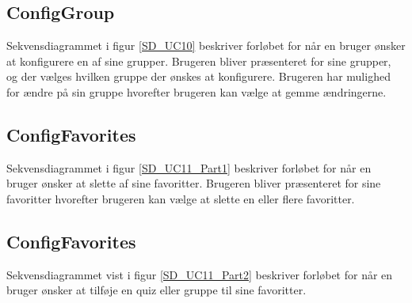 
\subsection*{ConfigGroup}
Sekvensdiagrammet i figur \ref{SD_UC10} beskriver forløbet for når en bruger ønsker at konfigurere en af sine grupper. Brugeren bliver præsenteret for sine grupper, og der vælges hvilken gruppe der ønskes at konfigurere. Brugeren har mulighed for ændre på sin gruppe hvorefter brugeren kan vælge at gemme ændringerne.


\subsection*{ConfigFavorites}
Sekvensdiagrammet i figur \ref{SD_UC11_Part1} beskriver forløbet for når en bruger ønsker at slette af sine favoritter. Brugeren bliver præsenteret for sine favoritter hvorefter brugeren kan vælge at slette en eller flere favoritter.


\subsection*{ConfigFavorites}
Sekvensdiagrammet vist i figur \ref{SD_UC11_Part2} beskriver forløbet for når en bruger ønsker at tilføje en quiz eller gruppe til sine favoritter.

